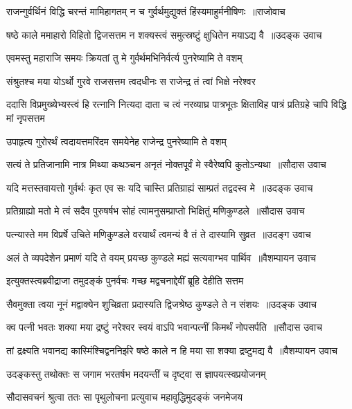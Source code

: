 \threelineshloka
{राजन्गुर्वर्थिनं विद्धि चरन्तं मामिहागतम्}
{न च गुर्वर्थमुद्युक्तं हिंस्यमाहुर्मनीषिणः ॥राजोवाच}
{}


\threelineshloka
{षष्ठे काले ममाहारो विहितो द्विजसत्तम}
{न शक्यस्त्वं समुत्स्रष्टुं क्षुधितेन मयाऽद्य वै ॥उदङ्क उवाच}
{}


\twolineshloka
{एवमस्तु महाराजि समयः क्रियतां तु मे}
{गुर्वर्थमभिनिर्वर्त्य पुनरेष्यामि ते वशम्}


\twolineshloka
{संश्रुतश्च मया योऽर्थो गुरवे राजसत्तम}
{त्वदधीनः स राजेन्द्र तं त्वां भिक्षे नरेश्वर}


\threelineshloka
{ददासि विप्रमुख्येभ्यस्त्वं हि रत्नानि नित्यदा}
{दाता च त्वं नरव्याघ्र पात्रभूतः क्षिताविह}
{पात्रं प्रतिग्रहे चापि विद्धि मां नृपसत्तम}


\twolineshloka
{उपाहृत्य गुरोरर्थं त्वदायत्तमरिंदम}
{समयेनेह राजेन्द्र पुनरेष्यामि ते वशम्}


\threelineshloka
{सत्यं ते प्रतिजानामि नात्र मिथ्या कथञ्चन}
{अनृतं नोक्तपूर्वं मे स्वैरेष्वपि कुतोऽन्यथा ॥सौदास उवाच}
{}


\threelineshloka
{यदि मत्तस्तवायत्तो गुर्वर्थः कृत एव सः}
{यदि चास्ति प्रतिग्राह्यं साम्प्रतं तद्वदस्व मे ॥उदङ्क उवाच}
{}


\threelineshloka
{प्रतिग्राह्यो मतो मे त्वं सदैव पुरुषर्षभ}
{सोहं त्वामनुसम्प्राप्तो भिक्षितुं मणिकुण्डले ॥सौदास उवाच}
{}


\threelineshloka
{पत्न्यास्ते मम विप्रर्षे उचिते मणिकुण्डले}
{वरयार्थं त्वमन्यं वै तं ते दास्यामि सुव्रत ॥उदङ्ग उवाच}
{}


\threelineshloka
{अलं ते व्यपदेशेन प्रमाणं यदि ते वयम्}
{प्रयच्छ कुण्डले मह्यं सत्यवाग्भव पार्थिव ॥वैशम्पायन उवाच}
{}


\twolineshloka
{इत्युक्तस्त्वब्रवीद्राजा तमुदङ्कं पुनर्वचः}
{गच्छ मद्वचनाद्देवीं ब्रूहि देहीति सत्तम}


\threelineshloka
{सैवमुक्ता त्वया नूनं मद्वाक्येन शुचिव्रता}
{प्रदास्यति द्विजश्रेष्ठ कुण्डले ते न संशयः ॥उदङ्क उवाच}
{}


\threelineshloka
{क्व पत्नी भवतः शक्या मया द्रष्टुं नरेश्वर}
{स्वयं वाऽपि भवान्पत्नीं किमर्थं नोपसर्पति ॥सौदास उवाच}
{}


\threelineshloka
{तां द्रक्ष्यति भवानद्य कास्मिंश्चिद्वननिर्झरे}
{षष्ठे काले न हि मया सा शक्या द्रष्टुमद्य वै ॥वैशम्पायन उवाच}
{}


\twolineshloka
{उदङ्कस्तु तथोक्तः स जगाम भरतर्षभ}
{मदयन्तीं च दृष्ट्वा स ज्ञापयत्स्वप्रयोजनम्}


\twolineshloka
{सौदासवचनं श्रुत्वा ततः सा पृथुलोचना}
{प्रत्युवाच महावुद्धिमुदङ्कं जनमेजय}


